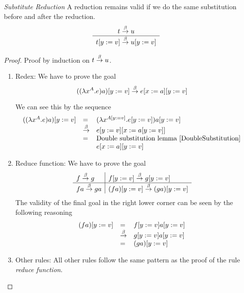 \begin{theorem}
    \label{SubstituteReduction}
    \emph{Substitute Reduction} A reduction remains valid if we do the same
    substitution before and after the reduction.
    $$
    \begin{array}{c} 
        t \stackrel{\beta}{\to} u
     \\ \hline 
        t[y:=v] \stackrel{\beta}{\to} u[y:=v]
    \end{array}
    $$

    \begin{proof}
        Proof by induction on $t \stackrel{\beta}{\to} u$.


        \begin{enumerate}

        \item Redex: We have to prove the goal
            $$
                ((\lambda x^A. e) a)[y:=v] \stackrel{\beta}{\to} e[x:=a][y:=v]
            $$

            We can see this by the sequence
            $$
            \begin{array}{lll}
                ((\lambda x^A. e) a)[y:=v]
                &=&
                (\lambda x^{A[y:=v]}. e[y:=v]) a[y:=v]
                \\
                &\stackrel{\beta}{\to}&
                e[y:=v][x:=a[y:=v]]
                \\
                &=& \text{Double substitution lemma~\ref{DoubleSubstitution}}
                \\
                &&e[x:=a][y:=v]
            \end{array}
            $$

        \item Reduce function: We have to prove the goal
            $$
            \begin{array}{l|l}
                f \stackrel{\beta}{\to} g
                & f[y:=v] \stackrel{\beta}{\to} g[y:=v]
                \\
                \hline
                f a \stackrel{\beta}{\to} g a
                &(f a)[y:=v] \stackrel{\beta}{\to} (g a)[y:=v]
            \end{array}
            $$
            The validity of the final goal in the right lower corner can be seen
            by the following reasoning
            $$
            \begin{array}{lll}
                (f a)[y:=v]
                &=&
                f[y:=v] a[y:=v]
                \\
                &\stackrel{\beta}{\to}&
                g[y:=v] a[y:=v]
                \\
                &=&
                (g a)[y:=v]
            \end{array}
            $$

        \item Other rules: All other rules follow the same pattern as the proof
            of the rule \emph{reduce function}.
        \end{enumerate}
    \end{proof}
\end{theorem}





